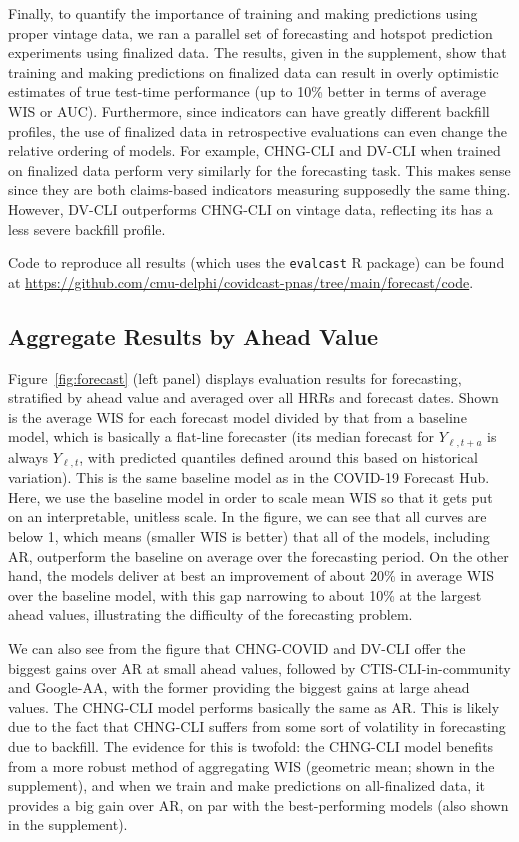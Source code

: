 \documentclass[9pt,twocolumn,twoside,lineno]{pnas-new}
\begin{document}
Finally, to quantify the importance of training and making predictions using
proper vintage data, we ran a parallel set of forecasting and hotspot prediction 
experiments using finalized data. The results, given in the supplement, show
that training and making predictions on finalized data can result in overly
optimistic estimates of true test-time performance (up to 10\% better in terms
of average WIS or AUC). Furthermore, since indicators can have greatly different
backfill profiles, the use of finalized data in retrospective evaluations can
even change the relative ordering of models.  For example, CHNG-CLI and DV-CLI
when trained on finalized data perform very similarly for the forecasting task.
This makes sense since they are both claims-based indicators measuring
supposedly the same thing.  However, DV-CLI outperforms CHNG-CLI on vintage
data, reflecting its has a less severe backfill profile.

Code to reproduce all results (which uses the \texttt{evalcast} R package) can 
be found at
\url{https://github.com/cmu-delphi/covidcast-pnas/tree/main/forecast/code}. 

\subsection{Aggregate Results by Ahead Value}

Figure~\ref{fig:forecast} (left panel) displays evaluation results for
forecasting, stratified by ahead value and averaged over all HRRs and forecast
dates.  Shown is the average WIS for each forecast model divided by that from a
baseline model, which is basically a flat-line forecaster (its median forecast
for $Y_{\ell,t+a}$ is always $Y_{\ell,t}$, with predicted quantiles defined
around this based on historical variation). This is the same baseline model as
in the COVID-19 Forecast Hub. Here, we use the baseline model in order to scale
mean WIS so that it gets put on an interpretable, unitless scale.  In the
figure, we can see that all curves are below 1, which means (smaller WIS is
better) that all of the models, including AR, outperform the baseline on average
over the forecasting period.  On the other hand, the models deliver at best an
improvement of about 20\% in average WIS over the baseline model, with this gap
narrowing to about 10\% at the largest ahead values, illustrating the difficulty 
of the forecasting problem.

We can also see from the figure that CHNG-COVID and DV-CLI offer the biggest
gains over AR at small ahead values, followed by CTIS-CLI-in-community and
Google-AA, with the former providing the biggest gains at large ahead values.
The CHNG-CLI model performs basically the same as AR.  This is likely due to the
fact that CHNG-CLI suffers from some sort of volatility in forecasting due to
backfill.  The evidence for this is twofold: the CHNG-CLI model benefits from a
more robust method of aggregating WIS (geometric mean; shown in the supplement),
and when we train and make predictions on all-finalized data, it provides a big
gain over AR, on par with the best-performing models (also shown in the
supplement).
\end{document}
